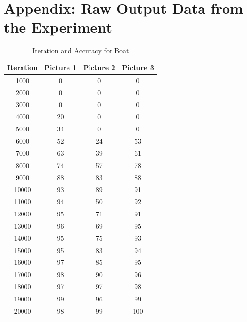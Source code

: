 \section{Appendix: Raw Output Data from the Experiment}

\begin{table}[h!]
\centering
\begin{tabular}{|c|c|c|c|}
\hline
\textbf{Iteration} & \textbf{Picture 1} & \textbf{Picture 2} & \textbf{Picture 3} \\
\hline
1000 & 0 & 0 & 0 \\
2000 & 0 & 0 & 0 \\
3000 & 0 & 0 & 0 \\
4000 & 20 & 0 & 0 \\
5000 & 34 & 0 & 0 \\
6000 & 52 & 24 & 53 \\
7000 & 63 & 39 & 61 \\
8000 & 74 & 57 & 78 \\
9000 & 88 & 83 & 88 \\
10000 & 93 & 89 & 91 \\
11000 & 94 & 50 & 92 \\
12000 & 95 & 71 & 91 \\
13000 & 96 & 69 & 95 \\
14000 & 95 & 75 & 93 \\
15000 & 95 & 83 & 94 \\
16000 & 97 & 85 & 95 \\
17000 & 98 & 90 & 96 \\
18000 & 97 & 97 & 98 \\
19000 & 99 & 96 & 99 \\
20000 & 98 & 99 & 100 \\
\hline
\end{tabular}
\caption{Iteration and Accuracy for Boat}
\end{table}


